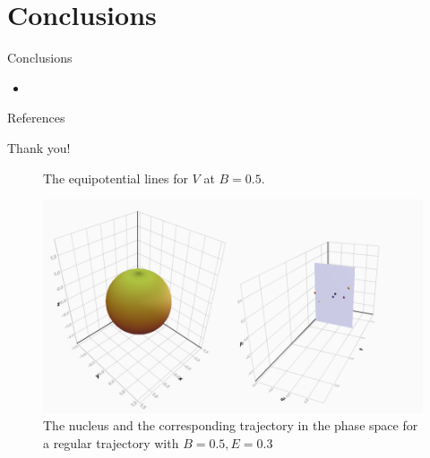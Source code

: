 \documentclass{beamer}
\begin{document}

\section{Conclusions}

\begin{frame}{Conclusions}
	\begin{itemize}
		\item
	\end{itemize}
\end{frame}


\begin{frame}[allowframebreaks]{References}


\end{frame}


\begin{frame}[standout]
Thank you!
\end{frame}

\appendix


\begin{frame}
	\begin{figure}
		
		\caption{The equipotential lines for \(V\) at \(B=0.5\).}
	\end{figure}
\end{frame}


\begin{frame}
	\begin{figure}
		\includegraphics[width=\textwidth]{nucleus-with-poincare}
		\caption{The nucleus and the corresponding trajectory in the phase space
		for a regular trajectory with \(B=0.5, E=0.3\)}
	\end{figure}
\end{frame}
\end{document}
